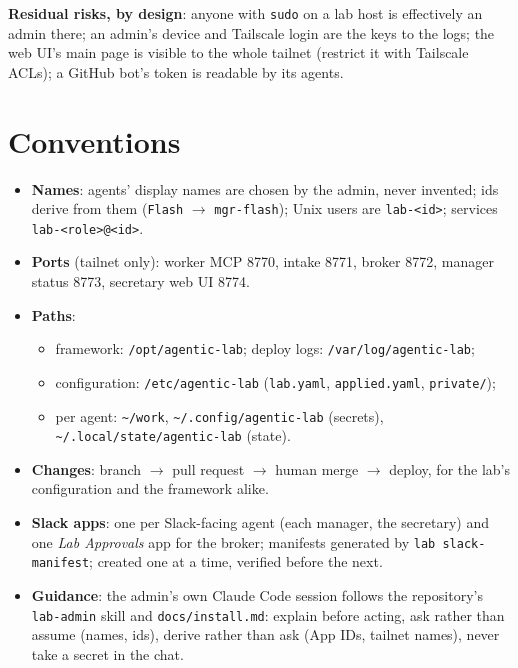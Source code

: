 \documentclass[11pt]{article}
\newcommand{\code}[1]{\texttt{#1}}
\begin{document}
\medskip
\textbf{Residual risks, by design}: anyone with \code{sudo} on a lab host is effectively an
admin there; an admin's device and Tailscale login are the keys to the logs; the web UI's
main page is visible to the whole tailnet (restrict it with Tailscale ACLs); a GitHub bot's
token is readable by its agents.

\section{Conventions}
\begin{itemize}
  \item \textbf{Names}: agents' display names are chosen by the admin, never invented; ids
    derive from them (\code{Flash} $\to$ \code{mgr-flash}); Unix users are
    \code{lab-<id>}; services \code{lab-<role>@<id>}.
  \item \textbf{Ports} (tailnet only): worker MCP 8770, intake 8771, broker 8772, manager
    status 8773, secretary web UI 8774.
  \item \textbf{Paths}:
    \begin{itemize}
      \item framework: \code{/opt/agentic-lab}; deploy logs: \code{/var/log/agentic-lab};
      \item configuration: \code{/etc/agentic-lab} (\code{lab.yaml},
        \code{applied.yaml}, \code{private/});
      \item per agent: \code{\textasciitilde/work}, \code{\textasciitilde/.config/agentic-lab}
        (secrets), \code{\textasciitilde/.local/state/agentic-lab} (state).
    \end{itemize}
  \item \textbf{Changes}: branch $\to$ pull request $\to$ human merge $\to$ deploy, for the
    lab's configuration and the framework alike.
  \item \textbf{Slack apps}: one per Slack-facing agent (each manager, the secretary) and
    one \emph{Lab Approvals} app for the broker; manifests generated by
    \code{lab slack-manifest}; created one at a time, verified before the next.
  \item \textbf{Guidance}: the admin's own Claude Code session follows the repository's
    \code{lab-admin} skill and \code{docs/install.md}: explain before acting, ask rather than
    assume (names, ids), derive rather than ask (App IDs, tailnet names), never take a
    secret in the chat.
\end{itemize}
\end{document}
